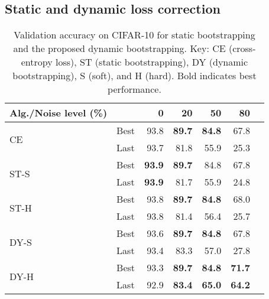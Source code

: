 \documentclass{article}
\providecommand{\tabularnewline}{\\}
\begin{document}
\subsection{Static and dynamic loss correction\label{subsec:Static-vs-Dynamic Boot}}

\begin{table}[t]
\begin{centering}
\caption{\label{tab:NmixDbootCIFAR}Validation accuracy on CIFAR-10 for static bootstrapping
and the proposed dynamic bootstrapping. Key: CE (cross-entropy loss), ST
(static bootstrapping), DY (dynamic bootstrapping), S (soft), and H
(hard). Bold indicates best performance.}
\vskip 0.15in 
\par\end{centering}
\begin{centering}
\begin{small}\begin{tabular}{llrrrrr}
\toprule 
Alg./Noise level (\%) &  & 0 & 20 & 50 & 80\tabularnewline
\hline 
\multirow{2}{*}{CE} & Best & 93.8 & \textbf{89.7} & \textbf{84.8} & 67.8\tabularnewline
 & Last & 93.7 & 81.8 & 55.9 & 25.3\tabularnewline
\midrule 
\multirow{2}{*}{ST-S} & Best & \textbf{93.9} & \textbf{89.7} & 84.8 & 67.8\tabularnewline
 & Last & \textbf{93.9} & 81.7 & 55.9 & 24.8\tabularnewline
\midrule 
\multirow{2}{*}{ST-H} & Best & 93.8 & \textbf{89.7} & \textbf{84.8} & 68.0\tabularnewline
 & Last & 93.8 & 81.4 & 56.4 & 25.7\tabularnewline
\midrule 
\multirow{2}{*}{DY-S} & Best & 93.6 & \textbf{89.7} & \textbf{84.8} & 67.8\tabularnewline
 & Last & 93.4 & 83.3 & 57.0 & 27.8\tabularnewline
\midrule 
\multirow{2}{*}{DY-H} & Best & 93.3 & \textbf{89.7} & \textbf{84.8} & \textbf{71.7}\tabularnewline
 & Last & 92.9 & \textbf{83.4} & \textbf{65.0} & \textbf{64.2}\tabularnewline
\bottomrule 
\end{tabular}\end{small}
\par\end{centering}
\centering{}\vskip -0.1in 
\end{table}
\end{document}

